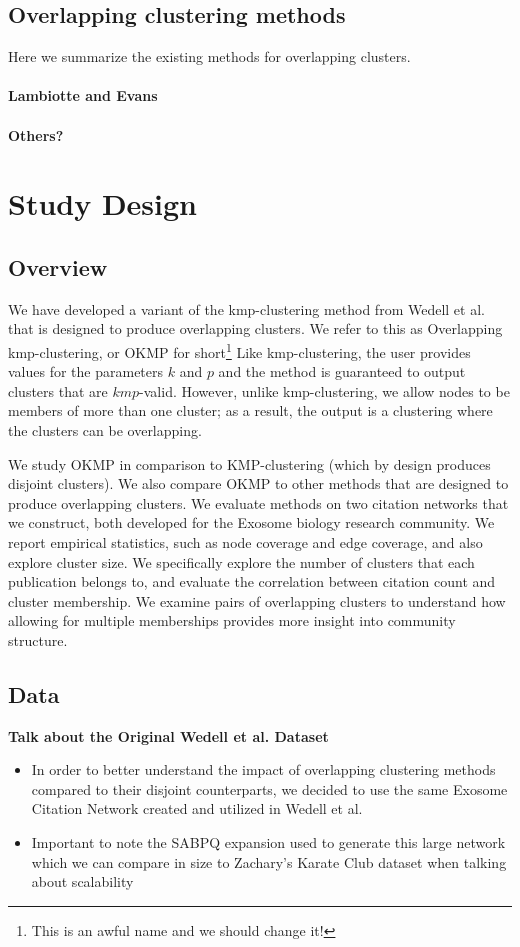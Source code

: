 \documentclass{article}
\begin{document}
\subsection{Overlapping clustering methods}

Here we summarize the existing methods for overlapping clusters.

\paragraph{Lambiotte and Evans}

\paragraph{Others?}

\section{Study Design}
\subsection{Overview}
We have developed a variant of the kmp-clustering method from Wedell et al. \cite{wedell2022center} that is designed to produce overlapping
clusters.
We refer to this as Overlapping kmp-clustering, or OKMP for short\footnote{This is an awful name and we should change it!}
Like kmp-clustering, the user provides values for the parameters $k$ and $p$ and the method is guaranteed to output
clusters that are $kmp$-valid.
However, unlike kmp-clustering, we allow nodes to be members of more than one cluster; as a result, the output is a clustering where
the clusters can be overlapping.

We study OKMP  in comparison to KMP-clustering (which by design produces disjoint clusters). 
We also compare OKMP to  other methods that are designed to produce overlapping clusters.
We evaluate methods on two citation networks that we construct, both developed for the Exosome biology research community.
We report empirical statistics, such as node coverage and edge coverage, and also explore cluster size.
We specifically explore the number of clusters that each publication belongs to, and evaluate the correlation between
citation count and cluster membership.
We examine pairs of overlapping clusters to understand how allowing for multiple memberships provides more insight into community
structure.

\subsection{Data}
\textbf{Talk about the Original Wedell et al. Dataset}
\begin{itemize}
	\item In order to better understand the impact of overlapping clustering methods compared to their disjoint counterparts, we decided to use the same Exosome Citation Network created and utilized in Wedell et al.
	\item Important to note the SABPQ expansion used to generate this large network which we can compare in size to Zachary's Karate Club dataset when talking about scalability
\end{itemize}
\end{document}
